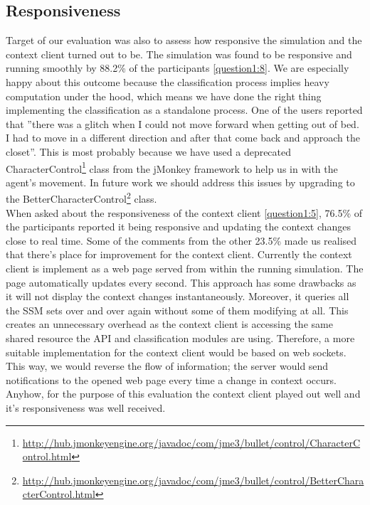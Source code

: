 \subsection{Responsiveness} %
\label{sec:eval_responsiveness}
Target of our evaluation was also to assess how responsive the simulation and the context client turned out to be. The simulation was found to be responsive and running smoothly by 88.2\% of the participants \ref{question1:8}. We are especially happy about this outcome because the classification process implies heavy computation under the hood, which means we have done the right thing implementing the classification as a standalone process. One of the users reported that ''there was a glitch when I could not move forward when getting out of bed. I had to move in a different direction and after that come back and approach the closet''. This is most probably because we have used a deprecated CharacterControl\footnote{\url{http://hub.jmonkeyengine.org/javadoc/com/jme3/bullet/control/CharacterControl.html}} class from the jMonkey framework to help us in with the agent's movement. In future work we should address this issues by upgrading to the BetterCharacterControl\footnote{\url{http://hub.jmonkeyengine.org/javadoc/com/jme3/bullet/control/BetterCharacterControl.html}} class.\\

When asked about the responsiveness of the context client \ref{question1:5}, 76.5\% of the participants reported it being responsive and updating the context changes close to real time. Some of the comments from the other 23.5\% made us realised that there's place for improvement for the context client. Currently the context client is implement as a web page served from within the running simulation. The page automatically updates every second. This approach has some drawbacks as it will not display the context changes instantaneously. Moreover, it queries all the SSM sets over and over again without some of them modifying at all. This creates an unnecessary overhead as the context client is accessing the same shared resource the API and classification modules are using. Therefore, a more suitable implementation for the context client would be based on web sockets. This way, we would reverse the flow of information; the server would send notifications to the opened web page every time a change in context occurs. Anyhow, for the purpose of this evaluation the context client played out well and it's responsiveness was well received.

